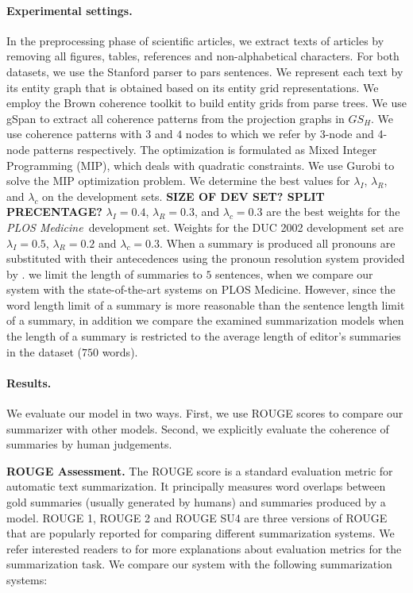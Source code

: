 \paragraph{Experimental settings.}
In the preprocessing phase of scientific articles, we extract texts of articles by removing all figures, tables, references and \mbox{non-alphabetical} characters.
For both datasets, we use the Stanford parser \cite{klein03b} to pars sentences. 
We represent each text by its entity graph that is obtained based on its entity grid representations. 
We employ the Brown coherence toolkit \cite{elsner11b} to build entity grids from parse trees.  
We use gSpan \cite{yanxifeng02} to extract all coherence patterns from the projection graphs in $GS_H$. 
We use coherence patterns with $3$ and $4$ nodes to which we refer by 3-node and 4-node patterns respectively. 
The optimization is formulated as Mixed Integer Programming (MIP), which deals with quadratic constraints. 
We use Gurobi \cite{gurobi14} to solve the MIP optimization problem.
We determine the best values for $\lambda_{I}$, $\lambda_R$, and $\lambda_{c}$ on the development sets.
\textbf{SIZE OF DEV SET? SPLIT PRECENTAGE?}
$\lambda_{I}=0.4$, $\lambda_R=0.3$, and $\lambda_{c}=0.3$ are the best weights for the \emph{PLOS Medicine}\ development set. 
Weights for the DUC 2002 development set are $\lambda_{I}=0.5$, $\lambda_R=0.2$ and $\lambda_{c}=0.3$.
When a summary is produced all pronouns are substituted with their antecedences using the pronoun resolution system provided by . 
we limit the length of summaries to $5$ sentences,  when we compare our system with the state-of-the-art systems on PLOS Medicine. 
However, since the word length limit of a summary is more reasonable than the sentence length limit of a summary, in addition we compare the examined summarization models when the length of a summary is restricted to the average length of editor's summaries in the dataset ($750$ words). 

\paragraph{Results.}
We evaluate our model in two ways. 
First, we use ROUGE scores to compare our summarizer with other models. 
Second, we explicitly evaluate the coherence of summaries by human judgements.

\textbf{ROUGE Assessment.}
The ROUGE score \cite{linchinyew04} is a standard evaluation metric for automatic text summarization. 
It principally measures word overlaps between gold summaries (usually generated by humans) and summaries produced by a model. 
ROUGE 1, ROUGE 2 and ROUGE SU4 are three versions of ROUGE that are popularly reported for comparing different summarization systems.  
We refer interested readers to   for more explanations about evaluation metrics for the summarization task. 
We compare our system with the following summarization systems: 

